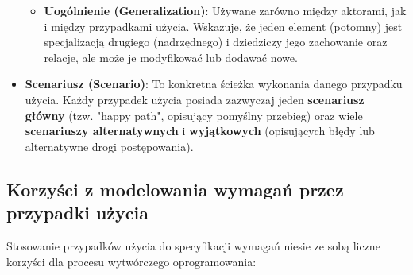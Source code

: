 \documentclass[a4paper,12pt]{article}
\begin{document}
\begin{itemize}
\begin{itemize}
        \item \textbf{Uogólnienie (Generalization)}: Używane zarówno między aktorami, jak i między przypadkami użycia. Wskazuje, że jeden element (potomny) jest specjalizacją drugiego (nadrzędnego) i dziedziczy jego zachowanie oraz relacje, ale może je modyfikować lub dodawać nowe.
    \end{itemize}

    \item \textbf{Scenariusz (Scenario)}: To konkretna ścieżka wykonania danego przypadku użycia. Każdy przypadek użycia posiada zazwyczaj jeden \textbf{scenariusz główny} (tzw. "happy path", opisujący pomyślny przebieg) oraz wiele \textbf{scenariuszy alternatywnych} i \textbf{wyjątkowych} (opisujących błędy lub alternatywne drogi postępowania).
\end{itemize}

\subsection{Korzyści z modelowania wymagań przez przypadki użycia}

Stosowanie przypadków użycia do specyfikacji wymagań niesie ze sobą liczne korzyści dla procesu wytwórczego oprogramowania:
\end{document}
